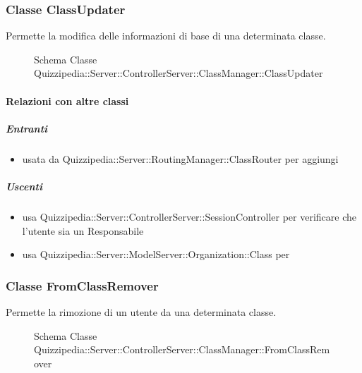 \subsubsection{Classe ClassUpdater}
Permette la modifica delle informazioni di base di una determinata classe.
\begin{figure}[H]
\centering
\noindent{}
\caption[Schema Classe ClassUpdater]{Schema Classe Quizzipedia::Server::ControllerServer::ClassManager::ClassUpdater}
\end{figure}
\paragraph{Relazioni con altre classi}
\subparagraph{Entranti}
\begin{itemize}
\item usata da Quizzipedia::Server::RoutingManager::ClassRouter per aggiungi
\end{itemize}
\subparagraph{Uscenti}
\begin{itemize}
\item usa Quizzipedia::Server::ControllerServer::SessionController per verificare che l'utente sia un Responsabile
\item usa Quizzipedia::Server::ModelServer::Organization::Class per 
\end{itemize}
\subsubsection{Classe FromClassRemover}
Permette la rimozione di un utente da una determinata classe.
\begin{figure}[H]
\centering
\noindent{}
\caption[Schema Classe FromClassRemover]{Schema Classe Quizzipedia::Server::ControllerServer::ClassManager::FromClassRemover}
\end{figure}
